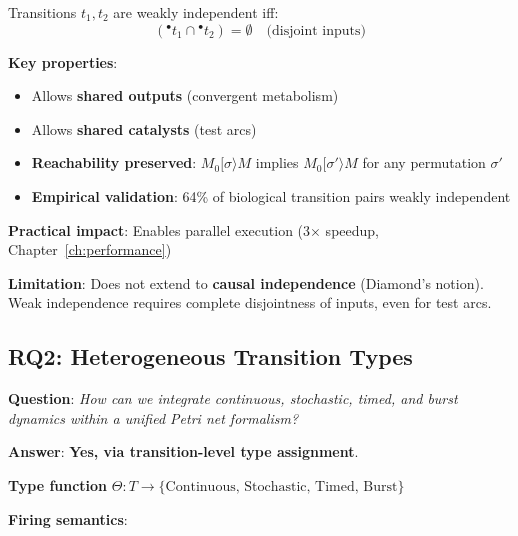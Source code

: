 \begin{definition}
Transitions $t_1, t_2$ are weakly independent iff:
\begin{equation}
({}^\bullet t_1 \cap {}^\bullet t_2) = \emptyset \quad \text{(disjoint inputs)}
\end{equation}
\end{definition}

\textbf{Key properties}:
\begin{itemize}
    \item Allows \textbf{shared outputs} (convergent metabolism)
    \item Allows \textbf{shared catalysts} (test arcs)
    \item \textbf{Reachability preserved}: $M_0[\sigma\rangle M$ implies $M_0[\sigma'\rangle M$ for any permutation $\sigma'$
    \item \textbf{Empirical validation}: 64\% of biological transition pairs weakly independent
\end{itemize}

\textbf{Practical impact}: Enables parallel execution (3$\times$ speedup, Chapter~\ref{ch:performance})

\textbf{Limitation}: Does not extend to \textbf{causal independence} (Diamond's notion). Weak independence requires complete disjointness of inputs, even for test arcs.

\subsection{RQ2: Heterogeneous Transition Types}
\label{subsec:rq2}

\textbf{Question}: \textit{How can we integrate continuous, stochastic, timed, and burst dynamics within a unified Petri net formalism?}

\textbf{Answer}: \textbf{Yes, via transition-level type assignment}.

\textbf{Type function} $\Theta: T \to \{\text{Continuous, Stochastic, Timed, Burst}\}$

\textbf{Firing semantics}:

